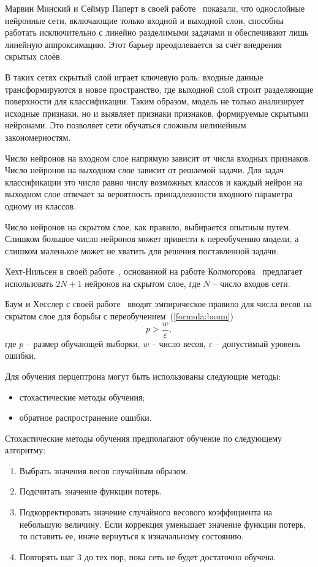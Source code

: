 Марвин Минский и Сеймур Паперт в своей работе~\cite{minsky1969perceptrons} показали, что однослойные нейронные сети, включающие только входной и выходной слои, способны работать исключительно с линейно разделимыми задачами и обеспечивают лишь линейную аппроксимацию.
Этот барьер преодолевается за счёт внедрения скрытых слоёв.

В таких сетях скрытый слой играет ключевую роль: входные данные трансформируются в новое пространство, где выходной слой строит разделяющие поверхности для классификации.
Таким образом, модель не только анализирует исходные признаки, но и выявляет признаки признаков, формируемые скрытыми нейронами. 
Это позволяет сети обучаться сложным нелинейным закономерностям.

Число нейронов на входном слое напрямую зависит от числа входных признаков.
Число нейронов на выходном слое зависит от решаемой задачи.
Для задач классификации это число равно числу возможных классов и каждый нейрон на выходном слое отвечает за вероятность принадлежности входного параметра одному из классов.

Число нейронов на скрытом слое, как правило, выбирается опытным путем.
Слишком большое число нейронов может привести к переобучению модели, а слишком маленькое может не хватить для решения поставленной задачи.

Хехт-Нильсен в своей работе~\cite{hecht1987}, основанной на работе Колмогорова~\cite{kolmogorov1957} предлагает использовать $2N + 1$ нейронов на скрытом слое, где $N$ -- число входов сети.

Баум и Хесслер с своей работе~\cite{baum1989} вводят эмпирическое правило для числа весов на скрытом слое для борьбы с переобучением~(\ref{formula:baum})
\begin{equation}\label{formula:baum}
	p > \frac{w}{\varepsilon},
\end{equation}
где $p$ -- размер обучающей выборки, $w$ -- число весов, $\varepsilon$ -- допустимый уровень ошибки.

Для обучения перцептрона могут быть использованы следующие методы:
\begin{itemize}
	\item стохастические методы обучения;
	\item обратное распространение ошибки.
\end{itemize}

Стохастические методы обучения предполагают обучение по следующему алгоритму:
\begin{enumerate}
	\item Выбрать значения весов случайным образом.
	\item Подсчитать значение функции потерь.
	\item Подкорректировать значение случайного весового коэффициента на небольшую величину. Если коррекция уменьшает значение функции потерь, то оставить ее, иначе вернуться к изначальному состоянию.
	\item Повторять шаг 3 до тех пор, пока сеть не будет достаточно обучена.
\end{enumerate}

